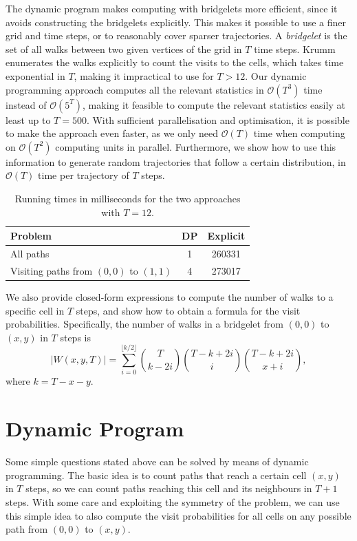 \documentclass[11pt,a4paper,twoside,british]{article}
\begin{document}
The dynamic program makes computing with bridgelets more efficient, since it
avoids constructing the bridgelets explicitly.
This makes it possible to use a finer grid and time steps, or to reasonably
cover sparser trajectories.
A \emph{bridgelet} is the set of all walks between two given vertices of the
grid in $T$ time steps.
Krumm enumerates the walks explicitly to count the visits to the cells, which
takes time exponential in $T$, making it impractical to use for $T > 12$.
Our dynamic programming approach computes all the relevant statistics in
$\mathcal{O}(T^3)$ time instead of $\mathcal{O}(5^T)$, making it feasible to
compute the relevant statistics easily at least up to $T = 500$.
With sufficient parallelisation and optimisation, it is possible to make the
approach even faster, as we only need $\mathcal{O}(T)$ time when computing on
$\mathcal{O}(T^2)$ computing units in parallel.
Furthermore, we show how to use this information to generate random trajectories
that follow a certain distribution, in $\mathcal{O}(T)$ time per trajectory of
$T$ steps.

\begin{table}
\centering
\begin{tabular}{l c c}
\toprule
Problem & DP & Explicit\\
\midrule
All paths & 1 & 260331\\
Visiting paths from $(0, 0)$ to $(1, 1)$ & 4 & 273017\\
\bottomrule
\end{tabular}
\caption{Running times in milliseconds for the two approaches with $T = 12$.}
\label{tab:running}
\end{table}

We also provide closed-form expressions to compute the number of walks to a
specific cell in $T$ steps, and show how to obtain a formula for the visit
probabilities.
Specifically, the number of walks in a bridgelet from $(0, 0)$ to $(x, y)$ in
$T$ steps is
\[\lvert W(x, y, T)\rvert = \sum_{i = 0}^{\lfloor k / 2\rfloor}
\binom{T}{k - 2i}\binom{T - k + 2i}{i}\binom{T - k + 2i}{x + i},\]
where $k = T - x - y$.

\section{Dynamic Program}
Some simple questions stated above can be solved by means of dynamic
programming.
The basic idea is to count paths that reach a certain cell $(x, y)$ in $T$
steps, so we can count paths reaching this cell and its neighbours in $T + 1$
steps.
With some care and exploiting the symmetry of the problem, we can use this
simple idea to also compute the visit probabilities for all cells on any
possible path from $(0, 0)$ to $(x, y)$.
\end{document}
